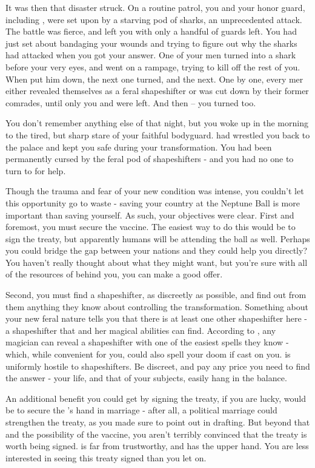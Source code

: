 \documentclass[char]{NeptuneBall}
\begin{document}
It was then that disaster struck. On a routine patrol, you and your honor guard, including \cBodyguard{}, were set upon by a starving pod of sharks, an unprecedented attack. The battle was fierce, and left you with only a handful of guards left. You had just set about bandaging your wounds and trying to figure out why the sharks had attacked when you got your answer. One of your men turned into a shark before your very eyes, and went on a rampage, trying to kill off the rest of you. When \cBodyguard{} put him down, the next one turned, and the next. One by one, every mer either revealed themselves as a feral shapeshifter or was cut down by their former comrades, until only you and \cBodyguard{} were left. And then -- you turned too.

You don't remember anything else of that night, but you woke up in the morning to the tired, but sharp stare of your faithful bodyguard. \cBodyguard{\They} had wrestled you back to the palace and kept you safe during your transformation. You had been permanently cursed by the feral pod of shapeshifters - and you had no one to turn to for help.

Though the trauma and fear of your new condition was intense, you couldn't let this opportunity go to waste - saving your country at the Neptune Ball is more important than saving yourself. As such, your objectives were clear. First and foremost, you must secure the \ppolio{} vaccine. The easiest way to do this would be to sign the treaty, but apparently humans will be attending the ball as well. Perhaps you could bridge the gap between your nations and they could help you directly? You haven't really thought about what they might want, but you're sure with all of the resources of \pPacifica{} behind you, you can make a good offer. 

Second, you must find a shapeshifter, as discreetly as possible, and find out from them anything they know about controlling the transformation. Something about your new feral nature tells you that there is at least one other shapeshifter here - a shapeshifter that \cBodyguard{} and her magical abilities can find. According to \cBodyguard{}, any magician can reveal a shapeshifter with one of the easiest spells they know - which, while convenient for you, could also spell your doom if cast on you.  \pAtlantis{} is uniformly hostile to shapeshifters.  Be discreet, and pay any price you need to find the answer - your life, and that of your subjects, easily hang in the balance.

An additional benefit you could get by signing the treaty, if you are lucky, would be to secure the \cPrincess{\prince}'s hand in marriage - after all, a political marriage could strengthen the treaty, as you made sure to point out in drafting. But beyond that and the possibility of the vaccine, you aren't terribly convinced that the treaty is worth being signed. \pAtlantis{} is far from trustworthy, and \pPacifica{} has the upper hand. You are less interested in seeing this treaty signed than you let on.
\end{document}
